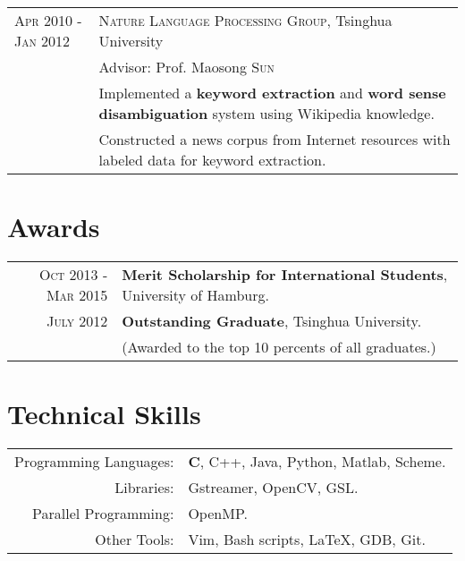 \documentclass[a4paper,11pt]{article} %
\begin{document}
\begin{tabular}{R{3.5cm}|p{11cm}}

  \textsc{Apr 2010 - Jan 2012} & \textsc{Nature Language Processing Group}, Tsinghua University \\
  & {\footnotesize Advisor:} Prof. Maosong \textsc{Sun} \\
  & {\footnotesize Implemented a \textbf{keyword extraction} and \textbf{word sense disambiguation} system using Wikipedia knowledge.} \\
  & {\footnotesize Constructed a news corpus from Internet resources with labeled data for keyword extraction.} \\

\end{tabular}


\section{Awards}

\begin{tabular}{rl}
  \textsc{Oct 2013 - Mar 2015} & \textbf{Merit Scholarship for International Students}, {\small University of Hamburg}. \\
  \textsc{July 2012} & \textbf{Outstanding Graduate}, {\small Tsinghua University}. \\
  & {\footnotesize (Awarded to the top 10 percents of all graduates.)}

\end{tabular}


\section{Technical Skills}

\begin{tabular}{rl}
  Programming Languages: & \textbf{C}, C++, Java, Python, Matlab, Scheme. \\
  Libraries: & Gstreamer, OpenCV, GSL. \\
  Parallel Programming: & OpenMP. \\
  Other Tools: & Vim, Bash scripts, \LaTeX, GDB, Git. \\
\end{tabular}
\end{document}
